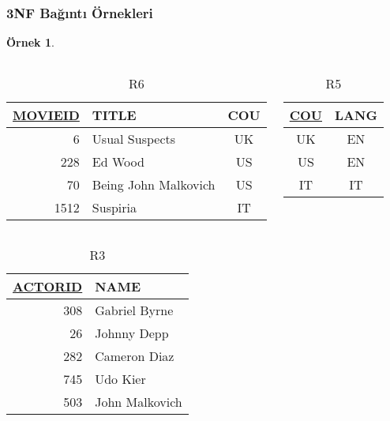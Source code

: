 \documentclass[dvipsnames]{beamer}
\theoremstyle{definition}
\theoremstyle{example}
\newtheorem{ornek}[theorem]{Örnek}
\theoremstyle{plain}
\begin{document}
\begin{frame}
  \frametitle{3NF Bağıntı Örnekleri}

  \begin{ornek}
    \begin{columns}[t]
      \begin{tiny}
      \begin{table}
        \caption{R6}
        \begin{tabular}{|r|l|c|}\hline
\underline{MOVIEID} & TITLE    & COU\\[2pt]\hline\hline
      6 & Usual Suspects       & UK \\\hline
    228 & Ed Wood              & US \\\hline
     70 & Being John Malkovich & US \\\hline
   1512 & Suspiria             & IT \\\hline
        \end{tabular}
      \end{table}
      \end{tiny}

      \begin{tiny}
      \begin{table}
        \caption{R5}
        \begin{tabular}{|c|c|}\hline
\underline{COU} & LANG\\[2pt]\hline\hline
UK & EN\\\hline
US & EN\\\hline
IT & IT\\\hline
        \end{tabular}
      \end{table}
      \end{tiny}
    \end{columns}

    \vspace{-0.7cm}
    \begin{columns}[t]
      \begin{tiny}
      \begin{table}
        \caption{R3}
        \begin{tabular}{|r|l|}\hline
\underline{ACTORID} & NAME\\[2pt]\hline\hline
      308 & Gabriel Byrne \\\hline
       26 & Johnny Depp   \\\hline
      282 & Cameron Diaz  \\\hline
      745 & Udo Kier      \\\hline
      503 & John Malkovich\\\hline
        \end{tabular}
      \end{table}
      \end{tiny}


\end{columns}
\end{ornek}
\end{frame}
\end{document}
